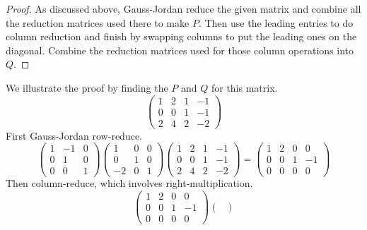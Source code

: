 \begin{proof}
As discussed above, Gauss-Jordan reduce the given matrix
and combine all the reduction matrices used there to make \( P \).
Then use the leading entries to do column reduction and
finish by swapping columns to put the leading ones on the diagonal.
Combine the reduction matrices used for those column operations into
\( Q \). 
\end{proof}

\begin{example}
We illustrate the proof by finding the $P$ and $Q$ for this matrix. 
\begin{equation*}
    \begin{pmatrix}
       1  &2  &1  &-1  \\
       0  &0  &1  &-1  \\
       2  &4  &2  &-2
    \end{pmatrix}
\end{equation*}
First Gauss-Jordan row-reduce.
\begin{equation*}
    \begin{pmatrix}
       1  &-1 &0    \\
       0  &1  &0    \\
       0  &0  &1
    \end{pmatrix}
    \begin{pmatrix}
       1  &0  &0    \\
       0  &1  &0    \\
       -2 &0  &1
    \end{pmatrix}
    \begin{pmatrix}
       1  &2  &1  &-1  \\
       0  &0  &1  &-1  \\
       2  &4  &2  &-2
    \end{pmatrix}
  =
    \begin{pmatrix}
       1  &2  &0  &0   \\
       0  &0  &1  &-1  \\
       0  &0  &0  &0
    \end{pmatrix}
\end{equation*}
Then column-reduce, which involves right-multiplication.
\begin{equation*}
    \begin{pmatrix}
       1  &2  &0  &0   \\
       0  &0  &1  &-1  \\
       0  &0  &0  &0
    \end{pmatrix}
    \begin{pmatrix}

\end{pmatrix}
\end{equation*}
\end{example}
